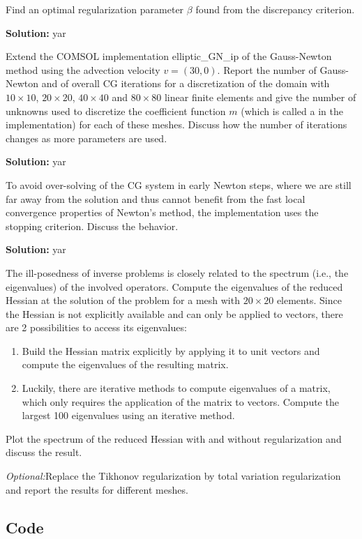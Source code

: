 \documentclass[11pt]{article}
\newenvironment{solution}{\begin{trivlist}\item[]{\bf Solution:}}
                      {\end{trivlist}}
\begin{document}
\begin{enumerate}
\item[(a)]Find an optimal regularization parameter $\beta$ found from the
	  discrepancy criterion.

\begin{solution}
yar
\end{solution}


\item[(b)]Extend the COMSOL implementation elliptic\_GN\_ip of the
	  Gauss-Newton method using the advection velocity
	  $v=(30,0)$. Report the number of Gauss-Newton and of overall
	  CG iterations for a discretization of the domain with $10
	  \times 10$, $20 \times 20$, $40 \times 40$ and $80 \times 80$
	  linear finite elements and give the number of unknowns used to
	  discretize the coefficient function $m$ (which is called a in
	  the implementation) for each of these meshes. Discuss how the
	  number of iterations changes as more parameters are used. 

\begin{solution}
yar
\end{solution}

\item[(c)]To avoid over-solving of the CG system in early Newton steps,
	  where we are still far away from the solution and thus cannot
	  benefit from the fast local convergence properties of Newton's
	  method, the implementation uses the stopping
	  criterion. Discuss the behavior.  


\begin{solution}
yar
\end{solution}

\item[(d)]The ill-posedness of inverse problems is closely related to
	  the spectrum (i.e., the eigenvalues) of the involved
	  operators. Compute the eigenvalues of the reduced Hessian at
	  the solution of the problem for a mesh with $20 \times 20$
	  elements. Since the Hessian is not explicitly available and
	  can only be applied to vectors, there are 2 possibilities to
	  access its eigenvalues: 
\begin{enumerate}
\item[$\bullet$] Build the Hessian matrix explicitly by applying it to
	     unit vectors and compute the eigenvalues of the resulting
	     matrix. 
\item[$\bullet$] Luckily, there are iterative methods to compute
	     eigenvalues of a matrix, which only requires the
	     application of the matrix to vectors. Compute the largest
	     100 eigenvalues using an iterative method. 
\end{enumerate}
Plot the spectrum of the reduced Hessian with and without regularization 
	  and discuss the result. 

\item[(e)]\textit{Optional:}Replace the Tikhonov regularization by total
	  variation regularization and report the results for different
	  meshes. 
\end{enumerate}

\newpage
\subsection*{Code}
%
\end{document}
